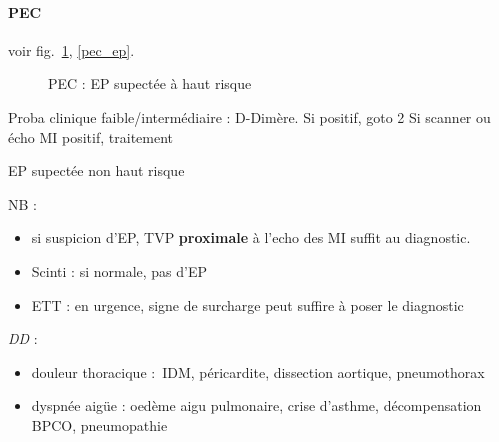 \paragraph{PEC} voir fig.~\ref{fig:pec_ep_risque}, \ref{pec_ep}.
\begin{figure}[htpb]                    
  \centering                              
  \caption{PEC : EP supectée à haut risque}
  \label{fig:pec_ep_risque}  
\end{figure}                            

\begin{algorithm}
  Proba clinique faible/intermédiaire : D-Dimère. Si positif, goto 2\;
  Si scanner ou écho MI positif, traitement\;
  \caption{EP supectée non haut risque}
  \label{fig:pec_ep}
\end{algorithm}

NB : 
\begin{itemize}
  \item si suspicion d'EP, TVP \textbf{proximale} à l'echo des MI suffit au
diagnostic.
  \item Scinti : si normale, pas d'EP
  \item ETT : en urgence, signe de surcharge peut suffire à poser le diagnostic
\end{itemize}

\textit{DD} :
\begin{itemize}
  \item douleur thoracique : IDM, péricardite, dissection aortique,
    pneumothorax
  \item dyspnée aigüe : oedème aigu pulmonaire, crise d'asthme, décompensation
    BPCO, pneumopathie
\end{itemize}

